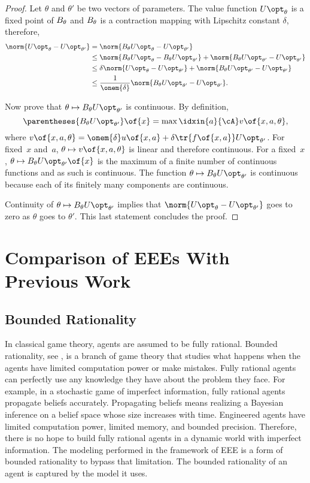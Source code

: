 \begin{proof}
Let \(\theta\) and \(\theta'\) be two vectors of parameters.
The value function \(\Utheta\) is a fixed point of \(B_{\theta}\) and \(B_{\theta}\) is a contraction mapping with Lipschitz constant \(\delta\), therefore,
\begin{align*}
\norm{\Utheta - \Uthetap} &= \norm{\Btheta \Utheta - \Uthetap} \\
&\le \norm{\Btheta \Utheta - \Btheta \Uthetap} + \norm{\Btheta\Uthetap - \Uthetap} \\
&\le \delta \norm{\Utheta - \Uthetap} + \norm{\Btheta\Uthetap - \Uthetap} \\
&\le \frac{1}{\onem{\delta}} \norm{\Btheta\Uthetap - \Uthetap}.
\end{align*}

Now prove that \(\theta \mapsto \Btheta \Uthetap\) is continuous.
By definition,
\begin{equation*}
\parentheses{\Btheta \Uthetap} \of{x} = \max\idxin{a}{\cA} v \of{x, a, \theta},
\end{equation*}
where \(v \of{x, a, \theta} = \onem{\delta} u \of{x, a} + \delta \tr{f \of{x, a}} \Uthetap\).
For fixed~\(x\) and~\(a\), \(\theta \mapsto v \of{x, a, \theta}\) is linear and therefore continuous.
For a fixed~\(x\), \(\theta \mapsto \Btheta \Uthetap \of{x}\) is the maximum of a finite number of continuous functions and as such is continuous.
The function \(\theta \mapsto \Btheta \Uthetap\) is continuous because each of its finitely many components are continuous.

Continuity of \(\theta \mapsto \Btheta \Uthetap\) implies that \(\norm{\Utheta - \Uthetap}\) goes to zero as \(\theta\) goes to \(\theta'\).
This last statement concludes the proof.
\end{proof}


\section{Comparison of EEEs With Previous Work}
\label{sec:comparison_of_eees_with_previous_work}


\subsection{Bounded Rationality}

In classical game theory, agents are assumed to be fully rational.
Bounded rationality, see \cite{rubinstein:1998}, is a branch of game theory that studies what happens when the agents have limited computation power or make mistakes.
Fully rational agents can perfectly use any knowledge they have about the problem they face.
For example, in a stochastic game of imperfect information, fully rational agents propagate beliefs accurately.
Propagating beliefs means realizing a Bayesian inference on a belief space whose size increases with time.
Engineered agents have limited computation power, limited memory, and bounded precision.
Therefore, there is no hope to build fully rational agents in a dynamic world with imperfect information.
The modeling performed in the framework of EEE is a form of bounded rationality to bypass that limitation.
The bounded rationality of an agent is captured by the model it uses.

